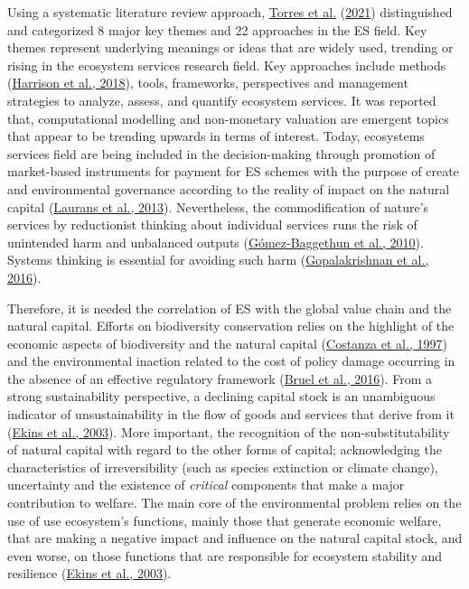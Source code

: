 \documentclass[]{elsarticle} %
\begin{document}
Using a systematic literature review approach, \protect\hyperlink{ref-Torres2021}{Torres et al.} (\protect\hyperlink{ref-Torres2021}{2021}) distinguished and categorized 8 major key themes and 22 approaches in the ES field. Key themes represent underlying meanings or ideas that are widely used, trending or rising in the ecosystem services research field.
Key approaches include methods (\protect\hyperlink{ref-Harrison2018}{Harrison et al., 2018}), tools, frameworks, perspectives and management strategies to analyze, assess, and quantify ecosystem services.
It was reported that, computational modelling and non-monetary valuation are emergent topics that appear to be trending upwards in terms of interest.
Today, ecosystems services field are being included in the decision-making through promotion of market-based instruments for payment for ES schemes with the purpose of create and environmental governance according to the reality of impact on the natural capital (\protect\hyperlink{ref-Laurans2013}{Laurans et al., 2013}).
Nevertheless, the commodification of nature's services by reductionist thinking about individual services runs the risk of unintended harm and unbalanced outputs (\protect\hyperlink{ref-Gomez-Baggethun2010}{Gómez-Baggethun et al., 2010}).
Systems thinking is essential for avoiding such harm (\protect\hyperlink{ref-Gopalakrishnan2016}{Gopalakrishnan et al., 2016}).

Therefore, it is needed the correlation of ES with the global value chain and the natural capital.
Efforts on biodiversity conservation relies on the highlight of the economic aspects of biodiversity and the natural capital (\protect\hyperlink{ref-Costanza1997}{Costanza et al., 1997}) and the environmental inaction related to the cost of policy damage occurring in the absence of an effective regulatory framework (\protect\hyperlink{ref-Bruel2016}{Bruel et al., 2016}).
From a strong sustainability perspective, a declining capital stock is an unambiguous indicator of unsustainability in the flow of goods and services that derive from it (\protect\hyperlink{ref-Ekins2003}{Ekins et al., 2003}).
More important, the recognition of the non-substitutability of natural capital with regard to the other forms of capital; acknowledging the characteristics of irreversibility (such as species extinction or climate change), uncertainty and the existence of \emph{critical} components that make a major contribution to welfare.
The main core of the environmental problem relies on the use of use ecosystem's functions, mainly those that generate economic welfare, that are making a negative impact and influence on the natural capital stock, and even worse, on those functions that are responsible for ecosystem stability and resilience (\protect\hyperlink{ref-Ekins2003}{Ekins et al., 2003}).
\end{document}
